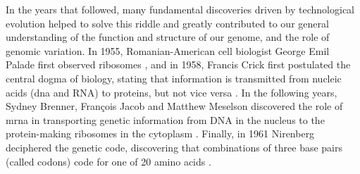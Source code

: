 In the years that followed, many fundamental discoveries driven by technological evolution helped to solve this riddle and greatly contributed to our general understanding of the function and structure of our genome, and the role of genomic variation.
In 1955, Romanian-American cell biologist George Emil Palade first observed ribosomes \cite{palade1955small}, and in 1958, Francis Crick first postulated the central dogma of biology, stating that information is transmitted from nucleic acids (\gls{dna} and RNA) to proteins, but not vice versa \cite{crick1958protein}.
In the following years, Sydney Brenner, François Jacob and Matthew Meselson discovered the role of \gls{mrna} in transporting genetic information from DNA in the nucleus to the protein-making ribosomes in the cytoplasm \cite{brenner1961unstable}.
Finally, in 1961 Nirenberg deciphered the genetic code, discovering that combinations of three base pairs (called codons) code for one of 20 amino acids
\cite{nirenberg1961dependence, crick1961general, matthaei1962characteristics, yanofsky2007establishing}.
